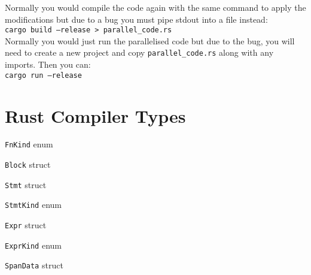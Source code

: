 Normally you would compile the code again with the same command to apply the modifications but due to a bug you must pipe stdout into a file instead:\\
\texttt{cargo build --release > parallel\_code.rs} \\

Normally you would just run the parallelised code but due to the bug, you will need to create a new project and copy \texttt{parallel\_code.rs} along with any imports. Then you can: \\
\texttt{cargo run --release}

%
%

\section{Rust Compiler Types}
\begin{code}
    \caption{\texttt{FnKind} enum}
    \label{lst:rustc-FnKind}
\end{code}

\begin{code}
    \caption{\texttt{Block} struct}
    \label{lst:rustc-Block}
\end{code}

\begin{code}
    \caption{\texttt{Stmt} struct}
    \label{lst:rustc-Stmt}
\end{code}

\begin{code}
    \caption{\texttt{StmtKind} enum}
    \label{lst:rustc-StmtKind}
\end{code}

\begin{code}
    \caption{\texttt{Expr} struct}
    \label{lst:rustc-Expr}
\end{code}

\begin{code}
    \caption{\texttt{ExprKind} enum}
    \label{lst:rustc-ExprKind}
\end{code}

\begin{code}
    \caption{\texttt{SpanData} struct}
    \label{lst:rustc-SpanData}
\end{code}
